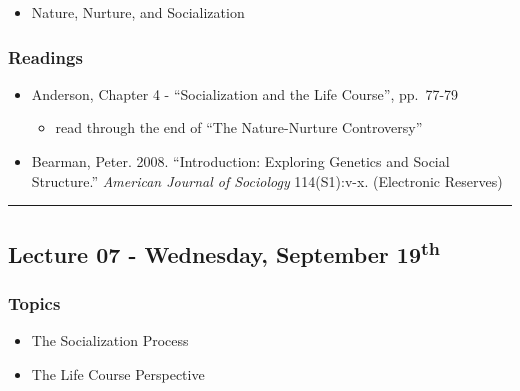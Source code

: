 \documentclass[]{book}
\providecommand{\tightlist}{%
  \setlength{\itemsep}{0pt}\setlength{\parskip}{0pt}}
\theoremstyle{definition}
\theoremstyle{definition}
\theoremstyle{definition}
\theoremstyle{remark}
\begin{document}
\begin{itemize}
\tightlist
\item
  Nature, Nurture, and Socialization
\end{itemize}

\hypertarget{readings-6}{%
\subsubsection*{Readings}\label{readings-6}}

\begin{itemize}
\tightlist
\item
  Anderson, Chapter 4 - ``Socialization and the Life Course'', pp.~77-79

  \begin{itemize}
  \tightlist
  \item
    read through the end of ``The Nature-Nurture Controversy''
  \end{itemize}
\item
  Bearman, Peter. 2008. ``Introduction: Exploring Genetics and Social
  Structure.'' \emph{American Journal of Sociology} 114(S1):v-x.
  (Electronic Reserves)
\end{itemize}

\begin{center}\rule{0.5\linewidth}{\linethickness}\end{center}

\hypertarget{lecture-07---wednesday-september-19th}{%
\subsection*{\texorpdfstring{Lecture 07 - Wednesday, September
19\textsuperscript{th}}{Lecture 07 - Wednesday, September 19th}}\label{lecture-07---wednesday-september-19th}}

\hypertarget{topics-7}{%
\subsubsection*{Topics}\label{topics-7}}

\begin{itemize}
\tightlist
\item
  The Socialization Process
\item
  The Life Course Perspective
\end{itemize}
\end{document}
